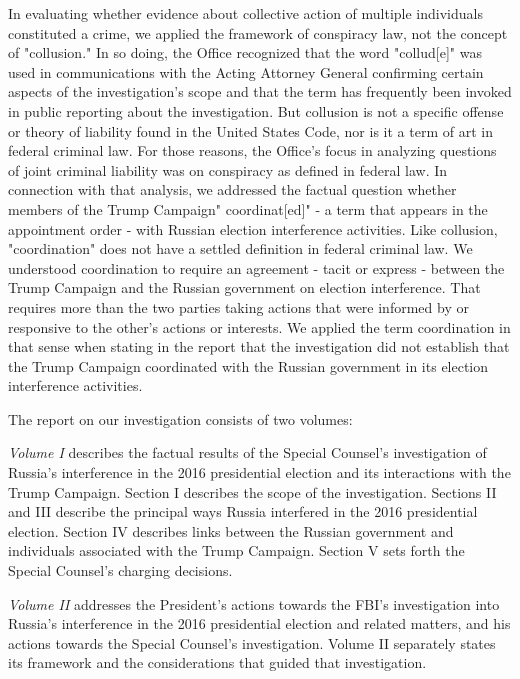 In evaluating whether evidence about collective action of multiple individuals constituted a crime, we applied the framework of conspiracy law, not the concept of "collusion."
In so doing, the Office recognized that the word "collud[e]" was used in communications with the Acting Attorney General confirming certain aspects of the investigation's scope and that the term has frequently been invoked in public reporting about the investigation.
But collusion is not a specific offense or theory of liability found in the United States Code, nor is it a term of art in federal criminal law.
For those reasons, the Office's focus in analyzing questions of joint criminal liability was on conspiracy as defined in federal law.
In connection with that analysis, we addressed the factual question whether members of the Trump Campaign" coordinat[ed]" - a term that appears in the appointment order - with Russian election interference activities.
Like collusion, "coordination" does not have a settled definition in federal criminal law.
We understood coordination to require an agreement - tacit or express - between the Trump Campaign and the Russian government on election interference.
That requires more than the two parties taking actions that were informed by or responsive to the other's actions or interests.
We applied the term coordination in that sense when stating in the report that the investigation did not establish that the Trump Campaign coordinated with the Russian government in its election interference activities.

\hr

The report on our investigation consists of two volumes:

\textit{Volume I} describes the factual results of the Special Counsel's investigation of Russia's interference in the 2016 presidential election and its interactions with the Trump Campaign.
Section I describes the scope of the investigation.
Sections II and III describe the principal ways Russia interfered in the 2016 presidential election.
Section IV describes links between the Russian government and individuals associated with the Trump Campaign.
Section V sets forth the Special Counsel's charging decisions.

\textit{Volume II} addresses the President's actions towards the FBI's investigation into Russia's interference in the 2016 presidential election and related matters, and his actions towards the Special Counsel's investigation.
Volume II separately states its framework and the considerations that guided that investigation.
